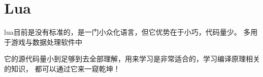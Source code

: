 \chapter{Lua}

lua目前是没有标准的，是一门小众化语言，但它优势在于小巧，代码量少。
多用于游戏与数据处理软件中

它的源代码量小到足够到去全部理解，用来学习是非常适合的，学习编译原理相关的知识，
都可以通过它来一窥乾坤！



